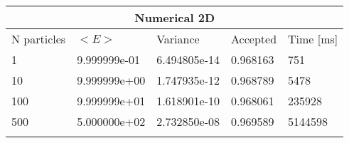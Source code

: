 \begin{tabular}{|l|l|l|l|l|}
\hline 
\multicolumn{5}{|c|}{Numerical 2D}\\ 
\hline 
N particles & $<E>$ & Variance & Accepted & Time [ms]\\ 
 \hline 
1 & 9.999999e-01 & 6.494805e-14 & 0.968163 & 751 \\ \hline 
10 & 9.999999e+00 & 1.747935e-12 & 0.968789 & 5478 \\ \hline 
100 & 9.999999e+01 & 1.618901e-10 & 0.968061 & 235928 \\ \hline 
500 & 5.000000e+02 & 2.732850e-08 & 0.969589 & 5144598 \\ \hline 
\label{h:n2} 
\end{tabular}
